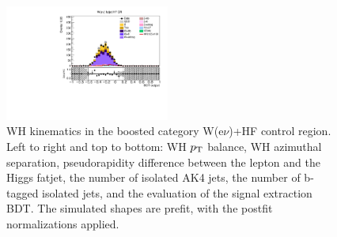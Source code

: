 \begin{figure}[tbp]
\begin{center}
    \includegraphics[width=0.48\textwidth]{figures/wlnhbb2016/boosted/WenWHHeavyFlavorFJCR_bdtValue.pdf}
    \caption{WH kinematics in the boosted category W(e$\nu$)+HF control region.
    Left to right and top to bottom: WH $p_{\mathrm{T}}$ balance, WH azimuthal separation,
    pseudorapidity difference between the lepton and the Higgs fatjet,
    the number of isolated AK4 jets, the number of b-tagged isolated jets,
    and the evaluation of the signal extraction BDT.
    The simulated shapes are prefit, with the postfit normalizations applied.}
    \label{fig:boost_WenHF_WH}
  \end{center}
\end{figure}
\clearpage


